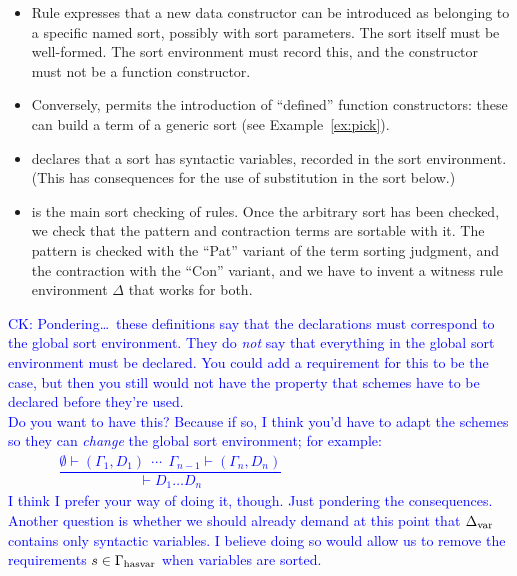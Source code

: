 \documentclass[letterpaper,11pt]{article}
\newcommand{\CK}[1]{\textcolor{blue}{CK: #1}}
\begin{document}
\begin{itemize}

\item Rule  expresses that a new data constructor can be introduced as belonging to
  a specific named sort, possibly with sort parameters. The sort itself must be well-formed. The
  sort environment must record this, and the constructor must not be a function constructor.

\item Conversely,  permits the introduction of ``defined'' function constructors:
  these can build a term of a generic sort (see Example~\ref{ex:pick}).

\item {} declares that a sort has syntactic variables, recorded in the sort
  environment. (This has consequences for the use of substitution in the sort below.)

\item {} is the main sort checking of rules. Once the arbitrary sort has been
  checked, we check that the pattern and contraction terms are sortable with it. The pattern is
  checked with the ``Pat'' variant of the term sorting judgment, and the contraction with the
  ``Con'' variant, and we have to invent a witness rule environment $Δ$ that works for both.

\end{itemize}

\CK{Pondering\dots\ these definitions say that the declarations must correspond
to the global sort environment.  They do \emph{not} say that everything in the
global sort environment must be declared.  You could add a requirement for this
to be the case, but then you still would not have the property that schemes have
to be declared before they're used. \\
Do you want to have this?  Because if so, I think you'd have to adapt the
schemes so they can \emph{change} the global sort environment; for example:
  \begin{align}
    &
    \dfrac
    { \emptyset ⊢ (Γ_1,D_1) ~~\cdots~~ Γ_{n-1} ⊢ (Γ_n,D_n) }
    { ⊢ D_1…D_n }
    \qquad\qquad
    && \qquad\qquad\qquad\qquad
    \tag{SH}
  \end{align}
I think I prefer your way of doing it, though.  Just pondering the consequences. \\
Another question is whether we should already demand at this point that
$\Delta_{\operatorname{var}}$ contains only syntactic variables.  I believe doing so would
allow us to remove the requirements $s \in \Gamma_{\operatorname{hasvar}}$ when variables
are sorted.}
\end{document}
